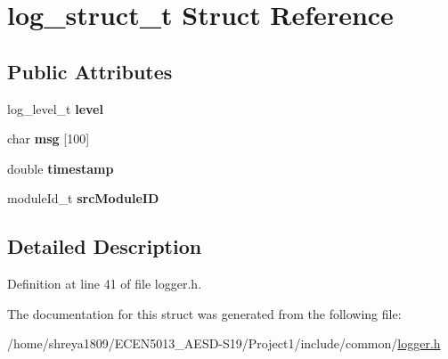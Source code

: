 \hypertarget{structlog__struct__t}{}\section{log\+\_\+struct\+\_\+t Struct Reference}
\label{structlog__struct__t}
\subsection*{Public Attributes}
\begin{DoxyCompactItemize}
\item 
\mbox{\label{structlog__struct__t_ab17eaca1fd2ec886aff4db33efa38d29}} 
log\+\_\+level\+\_\+t {\bfseries level}
\item 
\mbox{\label{structlog__struct__t_a4df114268b4a76cda98a857935e4309a}} 
char {\bfseries msg} \mbox{[}100\mbox{]}
\item 
\mbox{\label{structlog__struct__t_aa081dbf9f7e8bf4b214fedd40eea688e}} 
double {\bfseries timestamp}
\item 
\mbox{\label{structlog__struct__t_a46674802fa9e76e96243f0164d391696}} 
module\+Id\+\_\+t {\bfseries src\+Module\+ID}
\end{DoxyCompactItemize}


\subsection{Detailed Description}


Definition at line 41 of file logger.\+h.



The documentation for this struct was generated from the following file\+:\begin{DoxyCompactItemize}
\item 
/home/shreya1809/\+E\+C\+E\+N5013\+\_\+\+A\+E\+S\+D-\/\+S19/\+Project1/include/common/\hyperlink{logger_8h}{logger.\+h}\end{DoxyCompactItemize}
